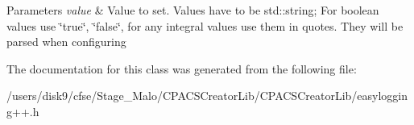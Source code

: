 \begin{DoxyParams}{Parameters}
{\em value} & Value to set. Values have to be std\-::string; For boolean values use \char`\"{}true\char`\"{}, \char`\"{}false\char`\"{}, for any integral values use them in quotes. They will be parsed when configuring \\
\hline
\end{DoxyParams}


The documentation for this class was generated from the following file\-:\begin{DoxyCompactItemize}
\item 
/users/disk9/cfse/\-Stage\-\_\-\-Malo/\-C\-P\-A\-C\-S\-Creator\-Lib/\-C\-P\-A\-C\-S\-Creator\-Lib/easylogging++.\-h\end{DoxyCompactItemize}
